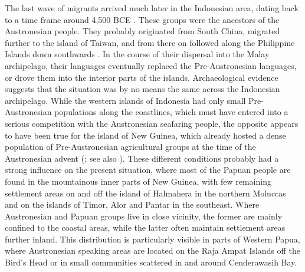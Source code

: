 The last wave of migrants arrived much later in the Indonesian area, dating back to a time frame around 4,500 BCE \citep{Bellwood1998, Bellwood2007}. These groups were the ancestors of the Austronesian people. They probably originated from South China, migrated further to the island of Taiwan, and from there on followed along the Philippine Islands down southwards \citep{Tryon1995, capelli2001}. In the course of their dispersal into the Malay archipelago, their languages eventually replaced the Pre-Austronesian languages, or drove them into the interior parts of the islands. Archaeological evidence suggests that the situation was by no means the same across the Indonesian archipelago. While the western islands of Indonesia had only small Pre-Austronesian populations along the coastlines, which must have entered into a serious competition with the Austronesian seafaring people, the opposite appears to have been true for the island of New Guinea, which already hosted a dense population of Pre-Austronesian agricultural groups at the time of the Austronesian advent (\citealt{Bellwood1998}; see also \citealt{Ross2005}). These different conditions probably had a strong influence on the present situation, where most of the Papuan people are found in the mountainous inner parts of New Guinea, with few remaining settlement areas on and off the island of Halmahera in the northern Moluccas and on the islands of Timor, Alor and Pantar in the southeast. Where Austronesian and Papuan groups live in close vicinity, the former are mainly confined to the coastal areas, while the latter often maintain settlement areas further inland. This distribution is particularly visible in parts of Western Papua, where Austronesian speaking areas are located on the Raja Ampat Islands off the Bird's Head or in small communities scattered in and around Cenderawasih Bay.

